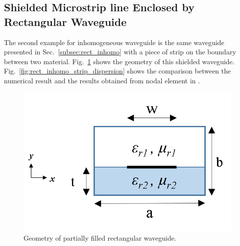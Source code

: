 \documentclass{pj}
\begin{document}
\subsection{Shielded Microstrip line Enclosed by Rectangular Waveguide}

The second example for inhomogeneous waveguide is the same waveguide presented in Sec.~\ref{subsec:rect_inhomo} with a piece of strip on the boundary between two material. Fig.~\ref{fig:rect_inhomo_strip_geom} shows the geometry of this shielded waveguide. Fig.~\ref{fig:rect_inhomo_strip_dispersion} shows the comparison between the numerical result and the results obtained from nodal element in \cite{na_JinJM_JinJM_2014_finite_element}. 


\begin{figure}[htbp]
	\centering
	\includegraphics[width=0.5\columnwidth]{./img/rectangular_inhomo_strip/geometry.png}
	\caption{Geometry of partially filled rectangular waveguide. }
	\label{fig:rect_inhomo_strip_geom}
\end{figure}

\newif\ifdisplayspuriousmodestrip
\displayspuriousmodestripfalse
\end{document}
